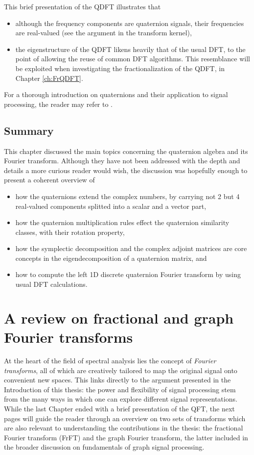 This brief presentation of the QDFT illustrates that
\begin{itemize}[noitemsep]
\item although the frequency components are quaternion signals, their frequencies are real-valued (see the argument in the transform kernel),
\item the eigenstructure of the QDFT likens heavily that of the usual DFT, to the point of allowing the reuse of common DFT algorithms. This resemblance will be exploited when investigating the fractionalization of the QDFT, in Chapter \ref{ch:FrQDFT}.
\end{itemize}

For a thorough introduction on quaternions and their application to signal processing, the reader may refer to \cite{grigoryan2018quaternion,zhang1997quaternions,ell2014quaternion,flamant2017time, jiang2014general}.

\section{Summary}

This chapter discussed the main topics concerning the quaternion algebra and its Fourier transform. Although they have not been addressed with the depth and details a more curious reader would wish, the discussion was hopefully enough to present a coherent overview of
\begin{itemize}[noitemsep]
\item how the quaternions extend the complex numbers, by carrying not 2 but 4 real-valued components splitted into a scalar and a vector part,
\item how the quaternion multiplication rules effect the quaternion similarity classes, with their rotation property,
\item how the symplectic decomposition and the complex adjoint matrices are core concepts in the eigendecomposition of a quaternion matrix, and
\item how to compute the left 1D discrete quaternion Fourier transform by using usual DFT calculations.
\end{itemize}

\chapter{A review on fractional and graph Fourier transforms}
\label{ch:reviewGSP}

At the heart of the field of spectral analysis lies the concept of \textit{Fourier transforms}, all of which are creatively tailored to map the original signal onto convenient new spaces. This links directly to the argument presented in the Introduction of this thesis: the power and flexibility of signal processing stem from the many ways in which one can explore different signal representations. While the last Chapter ended with a brief presentation of the QFT, the next pages will guide the reader through an overview on two sets of transforms which are also relevant to understanding the contributions in the thesis: the fractional Fourier transform (FrFT) and the graph Fourier transform, the latter included in the broader discussion on fundamentals of graph signal processing.

